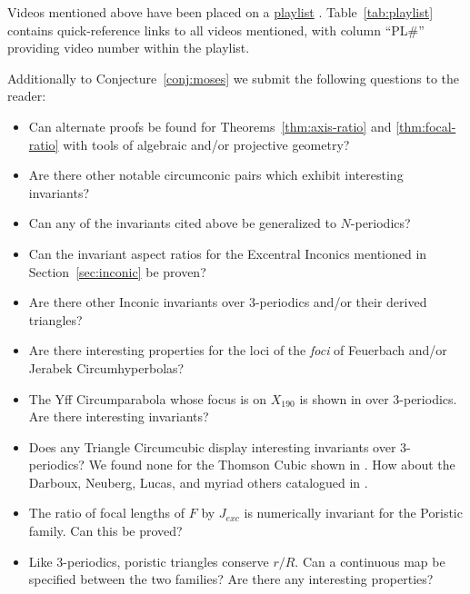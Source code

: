 Videos mentioned above have been placed on a \href{https://bit.ly/379mk1I}{playlist} \cite{reznik2020-playlist-circum}. Table~\ref{tab:playlist} contains quick-reference links to all videos mentioned, with column ``PL\#'' providing video number within the playlist.

Additionally to Conjecture~\ref{conj:moses} we submit the following questions to the reader:

\begin{itemize}
  \item Can alternate proofs be found for Theorems~\ref{thm:axis-ratio} and \ref{thm:focal-ratio} with tools of algebraic and/or projective geometry?
  \item Are there other notable circumconic pairs which exhibit interesting invariants?
  \item Can any of the invariants cited above be generalized to $N$-periodics?
  \item Can the invariant aspect ratios for the Excentral Inconics mentioned in Section~\ref{sec:inconic} be proven?
    \item Are there other Inconic invariants over 3-periodics and/or their derived triangles? 
    \item Are there interesting properties for the loci of the {\em foci} of Feuerbach and/or Jerabek Circumhyperbolas?
    \item The Yff Circumparabola whose focus is on $X_{190}$ is shown in \cite[PL\#12]{reznik2020-playlist-circum} over 3-periodics. Are there interesting invariants?
    \item Does any Triangle Circumcubic display interesting invariants over 3-periodics? We found none for the Thomson Cubic shown in \cite[PL\#13]{reznik2020-playlist-circum}. How about the Darboux, Neuberg, Lucas, and myriad others catalogued in \cite{gibert2020-cubics}.
    \item The ratio of focal lengths of $F$ by $J_{exc}$ is numerically invariant for the Poristic family. Can this be proved?
    \item Like 3-periodics, poristic triangles conserve $r/R$. Can a continuous map be specified between the two families? Are there any interesting properties?
\end{itemize}

